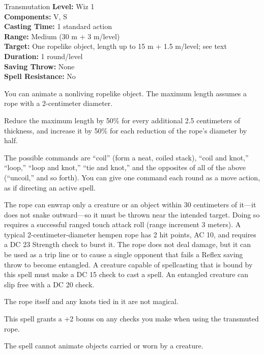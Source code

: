 {Transmutation}
{
	\textbf{Level:}
	Wiz 1\\
	\textbf{Components:}
	V, S\\
	\textbf{Casting Time:}
	1 standard action\\
	\textbf{Range:}
	Medium (30 m + 3 m/level)\\
	\textbf{Target:}
	One ropelike object, length up to 15 m + 1.5 m/level; see text\\
	\textbf{Duration:}
	1 round/level\\
	\textbf{Saving Throw:}
	None\\
	\textbf{Spell Resistance:}
	No\\
}
{
	You can animate a nonliving ropelike object. The maximum length assumes a rope with a 2-centimeter diameter.

	Reduce the maximum length by 50\% for every additional 2.5 centimeters of thickness, and increase it by 50\% for each reduction of the rope's diameter by half.

	The possible commands are ``coil'' (form a neat, coiled stack), ``coil and knot,'' ``loop,'' ``loop and knot,'' ``tie and knot,'' and the opposites of all of the above (``uncoil,'' and so forth). You can give one command each round as a move action, as if directing an active spell.

	The rope can enwrap only a creature or an object within 30 centimeters of it---it does not snake outward---so it must be thrown near the intended target. Doing so requires a successful ranged touch attack roll (range increment 3 meters). A typical 2-centimeter-diameter hempen rope has 2 hit points, AC 10, and requires a DC 23 Strength check to burst it. The rope does not deal damage, but it can be used as a trip line or to cause a single opponent that fails a Reflex saving throw to become entangled. A creature capable of spellcasting that is bound by this spell must make a DC 15  check to cast a spell. An entangled creature can slip free with a DC 20  check.

	The rope itself and any knots tied in it are not magical.

	This spell grants a +2 bonus on any  checks you make when using the transmuted rope.

	The spell cannot animate objects carried or worn by a creature.

}
